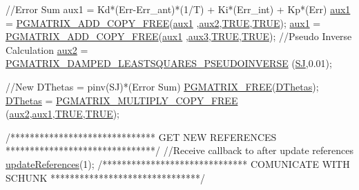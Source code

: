 \begin{DoxyCode}
                \textcolor{comment}{//Error Sum     aux1 = Kd*(Err-Err\_ant)*(1/T) + Ki*(Err\_int) +
       Kp*(Err)}
                \hyperlink{classCartesian__controller_a37edb9c6e2a5066f74941e3659f68cbc}{aux1} = \hyperlink{gmatrix__plus_8h_aa1123306aa55d942955e09156db757a3}{PGMATRIX\_ADD\_COPY\_FREE}(\hyperlink{classCartesian__controller_a37edb9c6e2a5066f74941e3659f68cbc}{aux1}
      ,\hyperlink{classCartesian__controller_af73a0c910cd80ed2f84974b65beba450}{aux2},\hyperlink{gmatlabdatafile_8h_aa8cecfc5c5c054d2875c03e77b7be15d}{TRUE},\hyperlink{gmatlabdatafile_8h_aa8cecfc5c5c054d2875c03e77b7be15d}{TRUE});
                \hyperlink{classCartesian__controller_a37edb9c6e2a5066f74941e3659f68cbc}{aux1} = \hyperlink{gmatrix__plus_8h_aa1123306aa55d942955e09156db757a3}{PGMATRIX\_ADD\_COPY\_FREE}(\hyperlink{classCartesian__controller_a37edb9c6e2a5066f74941e3659f68cbc}{aux1}
      ,\hyperlink{classCartesian__controller_aa37c15fcd53a60ecce106cd9b39d3501}{aux3},\hyperlink{gmatlabdatafile_8h_aa8cecfc5c5c054d2875c03e77b7be15d}{TRUE},\hyperlink{gmatlabdatafile_8h_aa8cecfc5c5c054d2875c03e77b7be15d}{TRUE});
                \textcolor{comment}{//Pseudo Inverse Calculation}
                \hyperlink{classCartesian__controller_af73a0c910cd80ed2f84974b65beba450}{aux2} =      \hyperlink{gmatrix__plus_8h_a73bceba2ac1f3a5589628d0f2e4081fa}{PGMATRIX\_DAMPED\_LEASTSQUARES\_PSEUDOINVERSE}
      (\hyperlink{classCartesian__controller_a98fdac06d136ac3dba0102d97cd5dd36}{SJ},0.01);

                \textcolor{comment}{//New DThetas = pinv(SJ)*(Error Sum)}
                \hyperlink{gmatrix_8h_a9a73b4e0a77f386c0bae1bba75298d1d}{PGMATRIX\_FREE}(\hyperlink{classCartesian__controller_a5d6419e62e130150edfcbd82b1dadcae}{DThetas});
                \hyperlink{classCartesian__controller_a5d6419e62e130150edfcbd82b1dadcae}{DThetas} = \hyperlink{gmatrix__plus_8h_a17b482a0aaa68d1f4c1c30a1a72dacbb}{PGMATRIX\_MULTIPLY\_COPY\_FREE}
      (\hyperlink{classCartesian__controller_af73a0c910cd80ed2f84974b65beba450}{aux2},\hyperlink{classCartesian__controller_a37edb9c6e2a5066f74941e3659f68cbc}{aux1},\hyperlink{gmatlabdatafile_8h_aa8cecfc5c5c054d2875c03e77b7be15d}{TRUE},\hyperlink{gmatlabdatafile_8h_aa8cecfc5c5c054d2875c03e77b7be15d}{TRUE});

                \textcolor{comment}{/******************************}
\textcolor{comment}{                         GET NEW REFERENCES}
\textcolor{comment}{                *******************************/}
                \textcolor{comment}{//Receive callback to after update references}
                \hyperlink{classCartesian__pose__controller_a965f86a383eb205df10832626fac98af}{updateReferences}(1);
                \textcolor{comment}{/******************************}
\textcolor{comment}{                        COMUNICATE WITH SCHUNK}
\textcolor{comment}{                *******************************/}


\end{DoxyCode}
